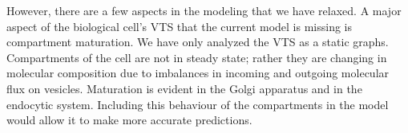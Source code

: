 %
However, there are a few aspects in the modeling that we have relaxed.
A major aspect of the biological cell’s VTS that the current model is missing is compartment maturation. 
%
We have only analyzed the VTS as a static graphs.
%
Compartments of the cell are not in steady state; rather they are changing in molecular composition due to imbalances in incoming and outgoing molecular flux on vesicles.
%
Maturation  is  evident  in  the  Golgi  apparatus  and  in  the  endocytic system. 
%
Including this behaviour of the compartments in the model would allow it to make more accurate predictions.
